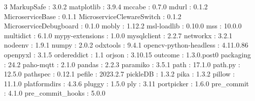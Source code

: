 \begin{multicols}{3}
MarkupSafe : 3.0.2\newline
matplotlib : 3.9.4\newline
mccabe : 0.7.0\newline
mdurl : 0.1.2\newline
MicroserviceBase : 0.1.1\newline
MicroserviceClewareSwitch : 0.1.2\newline
MicroserviceDebugboard : 0.1.0\newline
mobly : 1.12.2\newline
msl-loadlib : 0.10.0\newline
mss : 10.0.0\newline
multidict : 6.1.0\newline
mypy-extensions : 1.0.0\newline
mysqlclient : 2.2.7\newline
networkx : 3.2.1\newline
nodeenv : 1.9.1\newline
numpy : 2.0.2\newline
odxtools : 9.4.1\newline
opencv-python-headless : 4.11.0.86\newline
openpyxl : 3.1.5\newline
ordereddict : 1.1\newline
orjson : 3.10.15\newline
outcome : 1.3.0.post0\newline
packaging : 24.2\newline
paho-mqtt : 2.1.0\newline
pandas : 2.2.3\newline
paramiko : 3.5.1\newline
path : 17.1.0\newline
path.py : 12.5.0\newline
pathspec : 0.12.1\newline
pefile : 2023.2.7\newline
pickleDB : 1.3.2\newline
pika : 1.3.2\newline
pillow : 11.1.0\newline
platformdirs : 4.3.6\newline
pluggy : 1.5.0\newline
ply : 3.11\newline
portpicker : 1.6.0\newline
pre\_commit : 4.1.0\newline
pre\_commit\_hooks : 5.0.0\newline

\end{multicols}
